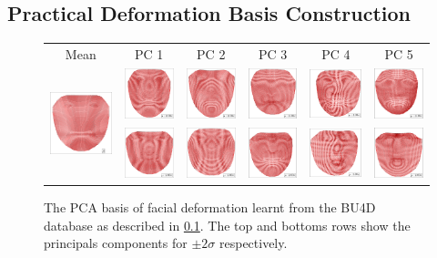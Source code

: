 \subsection{Practical Deformation Basis Construction}\label{subsec:face_flow_experiments_basis}
\setlength{\tabcolsep}{1pt}
\begin{figure}
    \centering
    \begin{tabular}{cccccc}
    Mean &  PC 1 & PC 2 & PC 3 & PC 4 & PC 5 \\
    \multirow{2}{*}{\includegraphics[valign=m,scale=0.16]{face_flow/images/of_pca_basis/mean}} &  \includegraphics[valign=m,scale=0.16]{face_flow/images/of_pca_basis/0_plus2} & \includegraphics[valign=m,scale=0.16]{face_flow/images/of_pca_basis/1_plus2} & \includegraphics[valign=m,scale=0.16]{face_flow/images/of_pca_basis/2_plus2} & \includegraphics[valign=m,scale=0.16]{face_flow/images/of_pca_basis/3_plus2} & \includegraphics[valign=m,scale=0.16]{face_flow/images/of_pca_basis/4_plus2} \\
     & \includegraphics[valign=m,scale=0.16]{face_flow/images/of_pca_basis/0_minus2} & \includegraphics[valign=m,scale=0.16]{face_flow/images/of_pca_basis/1_minus2} & \includegraphics[valign=m,scale=0.16]{face_flow/images/of_pca_basis/2_minus2} & \includegraphics[valign=m,scale=0.16]{face_flow/images/of_pca_basis/3_minus2} & \includegraphics[valign=m,scale=0.16]{face_flow/images/of_pca_basis/4_minus2}
    \end{tabular}%
    \caption{The PCA basis of facial deformation learnt from the 
             BU4D~\cite{yin2008high} database as described in 
             \cref{subsec:face_flow_experiments_basis}. The top and bottoms rows
             show the principals components for $\pm 2 \sigma$ respectively.}
\label{fig:face_flow_of_pca_basis}
\end{figure}
\setlength{\tabcolsep}{6pt}
